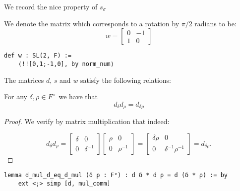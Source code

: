We record the nice property of $s_\sigma$


\begin{definition}
\label{SpecialMatrices.w}
\leanok
 We denote the matrix which corresponds to a rotation by $\pi / 2$ radians to be:
 \[
 w = \begin{bmatrix}
    0 & -1\\
    1 & 0
 \end{bmatrix}
 \]
\end{definition}
\begin{footnotesize}
\begin{verbatim}
def w : SL(2, F) :=
    ⟨!![0,1;-1,0], by norm_num⟩
\end{verbatim}
\end{footnotesize}

The matrices $d$, $s$ and $w$ satisfy the following relations:


\begin{lemma}
\label{SpecialMatrices.d_mul_d_eq_d_mul}
\leanok
For any $\delta, \rho \in F^\times$ we have that
\[
d_\delta d_\rho = d_{\delta\rho}
\]
\end{lemma}
\begin{proof}
\leanok
    We verify by matrix multiplication that indeed:

    \begin{equation*}
        d_\delta d_\rho = \begin{bmatrix} \delta & 0 \\ 0 & \delta^{-1} \end{bmatrix} \begin{bmatrix} \rho & 0 \\ 0 & \rho^{-1} \end{bmatrix} = \begin{bmatrix} \delta \rho & 0 \\ 0 & \delta^{-1} \rho^{-1} \end{bmatrix} = d_{\delta \rho}.
    \end{equation*}
\end{proof}
\begin{footnotesize}
\begin{verbatim}
lemma d_mul_d_eq_d_mul (δ ρ : Fˣ) : d δ * d ρ = d (δ * ρ) := by
    ext <;> simp [d, mul_comm]
\end{verbatim}
\end{footnotesize}

